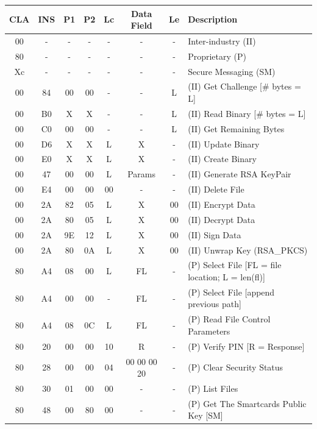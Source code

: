 \documentclass[bsc,frontabs,twoside,singlespacing,parskip,deptreport]{infthesis}     %
\begin{document}
\begin{table}[H]
\hskip-1.0cm\begin{tabular}{|c|c|c|c|c|c|c|p{8cm}|}
\hline
CLA & INS & P1 & P2 & Lc  & Data Field & Le & Description\\
\hline
00  & -   & -  & -  & -   & -          & -  & Inter-industry (II)\\
80  & -   & -  & -  & -   & -          & -  & Proprietary (P)\\
Xc  & -   & -  & -  & -   & -          & -  & Secure Messaging (SM)\\
\hline
00  & 84  & 00 & 00 & -   & -          & L  &  (II) Get Challenge [\# bytes = L]\\
00  & B0  & X  & X  & -   & -          & L  &  (II) Read Binary [\# bytes = L] \\
00  & C0  & 00 & 00 & -   & -          & L  &  (II) Get Remaining Bytes\\
00  & D6  & X  & X  & L   & X          & -  &  (II) Update Binary\\
00  & E0  & X  & X  & L   & X          & -  &  (II) Create Binary\\
00  & 47  & 00 & 00 & L   & Params     & -  &  (II) Generate RSA KeyPair\\
00  & E4  & 00 & 00 & 00  & -          & -  &  (II) Delete File\\
00  & 2A  & 82 & 05 & L   & X          & 00 &  (II) Encrypt Data \\
00  & 2A  & 80 & 05 & L   & X          & 00 &  (II) Decrypt Data \\
00  & 2A  & 9E & 12 & L   & X          & 00 &  (II) Sign Data \\
00  & 2A  & 80 & 0A & L   & X          & 00  & (II) Unwrap Key (RSA\_PKCS)\\
\hline
80  & A4  & 08 & 00 & L   & FL         & -  & (P) Select File [FL = file location; L = len(fl)]\\
80  & A4  & 00 & 00 & -   & FL         & -  & (P) Select File [append previous path]\\
80  & A4  & 08 & 0C & L   & FL         & -  & (P) Read File Control Parameters\\
80  & 20  & 00 & 00 & 10  & R          & -  & (P) Verify PIN [R = Response]\\
80  & 28  & 00 & 00 & 04  & 00 00 00 20& -  & (P) Clear Security Status\\
80  & 30  & 01 & 00 & 00  & -          & -  & (P) List Files\\
80  & 48  & 00 & 80 & 00  & -          & -  & (P) Get The Smartcards Public Key [SM]\\

\end{tabular}
\end{table}
\end{document}
